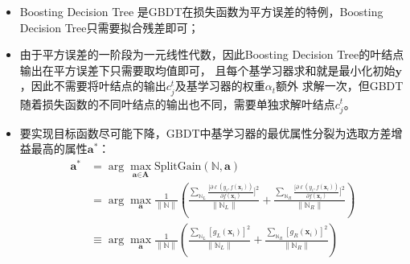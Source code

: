 \documentclass[a4paper]{article}
\begin{document}
			\begin{itemize}
				\item Boosting Decision Tree 是GBDT在损失函数为平方误差的特例，Boosting Decision Tree只需要拟合残差即可；
				\item 由于平方误差的一阶段为一元线性代数，因此Boosting Decision Tree的叶结点输出在平方误差下只需要取均值即可，
					且每个基学习器求和就是最小化初始$\textbf{y}$，因此不需要将叶结点的输出$c_j^t$及基学习器的权重$\alpha_t$额外
					求解一次，但GBDT随着损失函数的不同叶结点的输出也不同，需要单独求解叶结点$c_j^t$。
				\item 要实现目标函数尽可能下降，GBDT中基学习器的最优属性分裂为选取方差增益最高的属性$\textbf{a}^*$：
					\begin{align*}
						\textbf{a}^{*}	& = \arg\max_{\textbf{a}\in\textbf{A}}\text{SplitGain}(\mathbb{N},\textbf{a})\\
										& = \arg\max_{\textbf{a}} \frac{1}{\|\mathbb{N}\|}\left(
											\frac{\sum_{\mathbb{N}_L}\frac{[\partial \ell(y_i, f(\textbf{x}_i))}{\partial f(\textbf{x}_i)}]^2}{\|\mathbb{N}_L\|}+
											\frac{\sum_{\mathbb{N}_R}\frac{[\partial \ell(y_i, f(\textbf{x}_i))}{\partial f(\textbf{x}_i)}]^2}{\|\mathbb{N}_R\|}\right)\\
										& \equiv \arg\max_{\textbf{a}} \frac{1}{\|\mathbb{N}\|}\left(
											\frac{\sum_{\mathbb{N}_L}[g_L(\textbf{x}_i)]^2}{\|\mathbb{N}_L\|}+
											\frac{\sum_{\mathbb{N}_R}[g_R(\textbf{x}_i)]^2}{\|\mathbb{N}_R\|}\right)
					\end{align*}
			\end{itemize}
\end{document}
